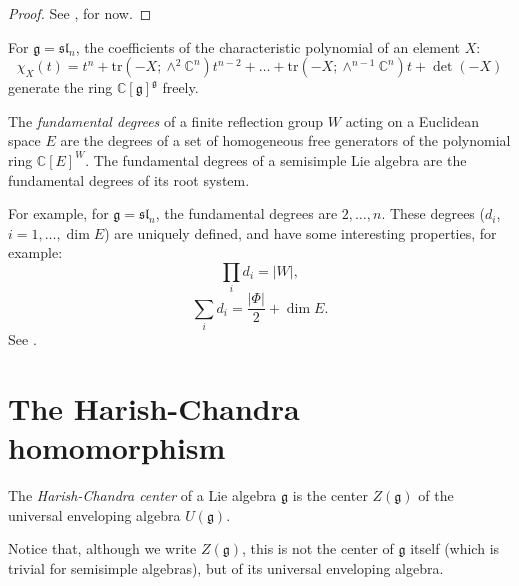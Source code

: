 \begin{proof}
 See \cite{Sternberg}, for now. 
\end{proof}

\begin{example}
\label{example-invariants-sl2}
 For $\mathfrak g= \mathfrak{sl}_n$, the coefficients of the characteristic polynomial of an element $X$:
 $$ \chi_X(t) = t^n + \text{tr}(-X; \wedge^2 \mathbb C^n) t^{n-2} + \dots + \text{tr}(-X; \wedge^{n-1} \mathbb C^n) t + \det(-X)$$
 generate the ring $\mathbb C[\mathfrak g]^{\mathfrak g}$ freely.
\end{example}


\begin{definition}
 \label{definition-fundamental-invariants}
 The {\it fundamental degrees} of a finite reflection group $W$ acting on a Euclidean space $E$ are the degrees of a set of homogeneous free generators of the polynomial ring $\mathbb C[E]^W$. The fundamental degrees of a semisimple Lie algebra are the fundamental degrees of its root system.
\end{definition}

For example, for $\mathfrak g=\mathfrak{sl}_n$, the fundamental degrees are $2, \dots, n$.
These degrees ($d_i$, $i=1, \dots, \dim E$) are uniquely defined, and have some interesting properties, for example: 
\begin{equation}
 \label{equation-degrees-product}
 \prod_i d_i = |W|,
\end{equation}
\begin{equation}
 \label{equation-degrees-sum}
 \sum_i d_i = \frac{|\Phi|}{2} + \dim E.
\end{equation}
See \cite[\S 3]{Humphreys-reflection}.


\section{The Harish-Chandra homomorphism}
\label{section-HC-homomorphism}

\begin{definition}
 \label{definition-HC-center}
The {\it Harish-Chandra center} of a Lie algebra $\mathfrak g$ is the center $Z(\mathfrak g)$ of the universal enveloping algebra $U(\mathfrak g)$.
\end{definition}

Notice that, although we write $Z(\mathfrak g)$, this is not the center of $\mathfrak g$ itself (which is trivial for semisimple algebras), but of its universal enveloping algebra. 

